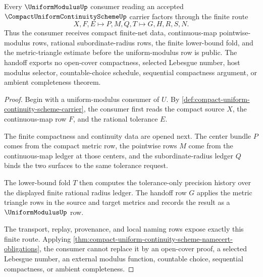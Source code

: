 \begin{theorem}
\label{thm:compact-uniform-continuity-scheme-handoff}
Every $\UniformModulusUp$ consumer reading an accepted $\CompactUniformContinuitySchemeUp$ carrier factors through the finite route
$$
X,F,E \longmapsto P,M,Q,T \longmapsto G,H,R,S,N .
$$
Thus the consumer receives compact finite-net data, continuous-map pointwise-modulus rows, rational subordinate-radius rows, the finite lower-bound fold, and the metric-triangle estimate before the uniform-modulus row is public. The handoff exports no open-cover compactness, selected Lebesgue number, host modulus selector, countable-choice schedule, sequential compactness argument, or ambient completeness theorem.
\end{theorem}
\begin{proof}
Begin with a uniform-modulus consumer of $U$. By \autoref{def:compact-uniform-continuity-scheme-carrier}, the consumer first reads the compact source $X$, the continuous-map row $F$, and the rational tolerance $E$.

The finite compactness and continuity data are opened next. The center bundle $P$ comes from the compact metric row, the pointwise rows $M$ come from the continuous-map ledger at those centers, and the subordinate-radius ledger $Q$ binds the two surfaces to the same tolerance request.

The lower-bound fold $T$ then computes the tolerance-only precision history over the displayed finite rational radius ledger. The handoff row $G$ applies the metric triangle rows in the source and target metrics and records the result as a $\UniformModulusUp$ row.

The transport, replay, provenance, and local naming rows expose exactly this finite route. Applying \autoref{thm:compact-uniform-continuity-scheme-namecert-obligations}, the consumer cannot replace it by an open-cover proof, a selected Lebesgue number, an external modulus function, countable choice, sequential compactness, or ambient completeness.
\end{proof}


